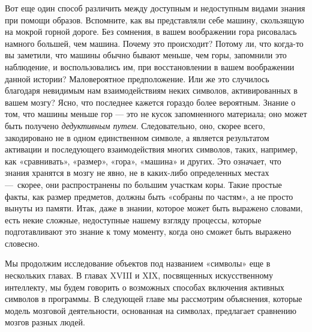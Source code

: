 \documentclass[../main.tex]{subfiles}
\begin{document}
Вот еще один способ различить между доступным и недоступным видами знания при помощи образов. Вспомните, как вы представляли себе машину, скользящую на мокрой горной дороге. Без сомнения, в вашем воображении гора рисовалась намного большей, чем машина. Почему это происходит? Потому ли, что когда-то вы заметили, что машины обычно бывают меньше, чем горы, запомнили это наблюдение, и воспользовались им, при восстановлении в вашем воображении данной истории? Маловероятное предположение. Или же это случилось благодаря невидимым нам взаимодействиям неких символов, активированных в вашем мозгу? Ясно, что последнее кажется гораздо более вероятным. Знание о том, что машины меньше гор --- это не кусок запомненного материала; оно может быть получено \emph{дедуктивным путем}. Следовательно, оно, скорее всего, закодировано не в одном единственном символе, а является результатом активации и последующего взаимодействия многих символов, таких, например, как «сравнивать», «размер», «гора», «машина» и других. Это означает, что знания хранятся в мозгу не явно, не в каких-либо определенных местах ---~скорее, они распространены по большим участкам коры. Такие простые факты, как размер предметов, должны быть «собраны по частям», а не просто вынуты из памяти. Итак, даже в знании, которое может быть выражено словами, есть некие сложные, недоступные нашему взгляду процессы, которые подготавливают это знание к тому моменту, когда оно сможет быть выражено словесно.

Мы продолжим исследование объектов под названием «символы» еще в нескольких главах. В главах XVIII и XIX, посвященных искусственному интеллекту, мы будем говорить о возможных способах включения активных символов в программы. В следующей главе мы рассмотрим объяснения, которые модель мозговой деятельности, основанная на символах, предлагает сравнению мозгов разных людей.
\end{document}
